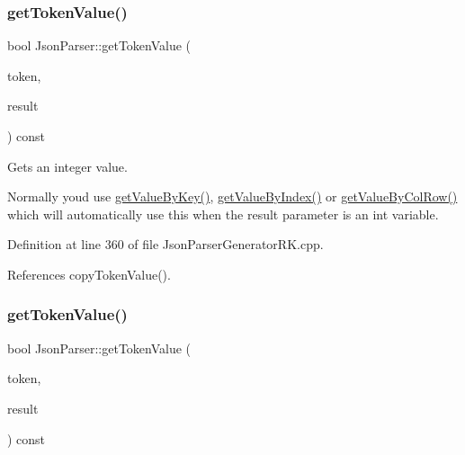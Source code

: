 \subsubsection{\texorpdfstring{get\+Token\+Value()}{getTokenValue()}\hspace{0.1cm}{\footnotesize\ttfamily [2/8]}}
{\footnotesize\ttfamily bool Json\+Parser\+::get\+Token\+Value (\begin{DoxyParamCaption}\item[{const \hyperlink{struct_json_parser_generator_r_k_1_1jsmntok__t}{Json\+Parser\+Generator\+R\+K\+::jsmntok\+\_\+t} $\ast$}]{token,  }\item[{int \&}]{result }\end{DoxyParamCaption}) const}



Gets an integer value. 

Normally you\textquotesingle{}d use \hyperlink{class_json_parser_a13abcdcb2341f65ac358bb4d81007d06}{get\+Value\+By\+Key()}, \hyperlink{class_json_parser_a53bd8a6ebb0d9b246b876653e792368f}{get\+Value\+By\+Index()} or \hyperlink{class_json_parser_af1f4a3a65b5cc9cd19b129c410aa78e0}{get\+Value\+By\+Col\+Row()} which will automatically use this when the result parameter is an int variable. 

Definition at line 360 of file Json\+Parser\+Generator\+R\+K.\+cpp.



References copy\+Token\+Value().

\mbox{\label{class_json_parser_ad6289b63a2281dc516e4a81aa3660ac7}} 
\subsubsection{\texorpdfstring{get\+Token\+Value()}{getTokenValue()}\hspace{0.1cm}{\footnotesize\ttfamily [3/8]}}
{\footnotesize\ttfamily bool Json\+Parser\+::get\+Token\+Value (\begin{DoxyParamCaption}\item[{const \hyperlink{struct_json_parser_generator_r_k_1_1jsmntok__t}{Json\+Parser\+Generator\+R\+K\+::jsmntok\+\_\+t} $\ast$}]{token,  }\item[{unsigned long \&}]{result }\end{DoxyParamCaption}) const}



